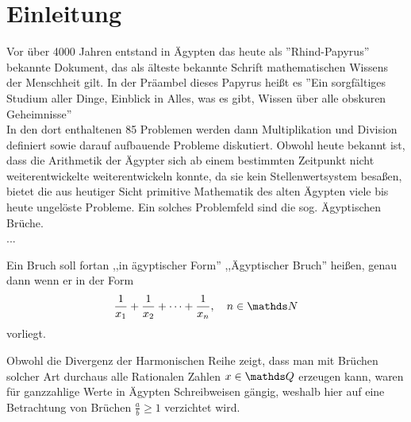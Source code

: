 \section{Einleitung}
Vor über 4000 Jahren entstand in Ägypten das heute als ''Rhind-Papyrus'' bekannte Dokument, das als älteste bekannte Schrift mathematischen Wissens der Menschheit gilt. In der Präambel dieses Papyrus heißt es ''Ein sorgfältiges Studium aller Dinge, Einblick in Alles, was es gibt, Wissen über alle obskuren Geheimnisse'' \cite[S. 37, Übersetzung durch den Autor]{Burton2011}\\ In den dort enthaltenen 85 Problemen werden dann Multiplikation und Division definiert sowie darauf aufbauende Probleme diskutiert. Obwohl heute bekannt ist, dass die Arithmetik der Ägypter sich ab einem bestimmten Zeitpunkt nicht weiterentwickelte \bzw weiterentwickeln konnte, da sie  kein Stellenwertsystem besaßen, bietet die aus heutiger Sicht primitive Mathematik des alten Ägypten viele bis heute ungelöste Probleme. Ein solches Problemfeld sind die sog. Ägyptischen Brüche.
\\...

\begin{def1}
	Ein Bruch soll fortan ,,in ägyptischer Form'' \bzw  ,,Ägyptischer Bruch'' heißen, genau dann wenn er in der Form
	$$\uf{x_1} + \uf{x_2} + \cdots + \uf{x_n}, \quad n \in \N$$
	vorliegt.
\end{def1}

Obwohl die Divergenz der Harmonischen Reihe zeigt, dass man mit Brüchen solcher Art durchaus alle Rationalen Zahlen $x \in \Q$ erzeugen kann, waren für ganzzahlige Werte in Ägypten Schreibweisen gängig, weshalb hier auf eine Betrachtung von Brüchen $\frac{a}{b} \geq 1$ verzichtet wird.
